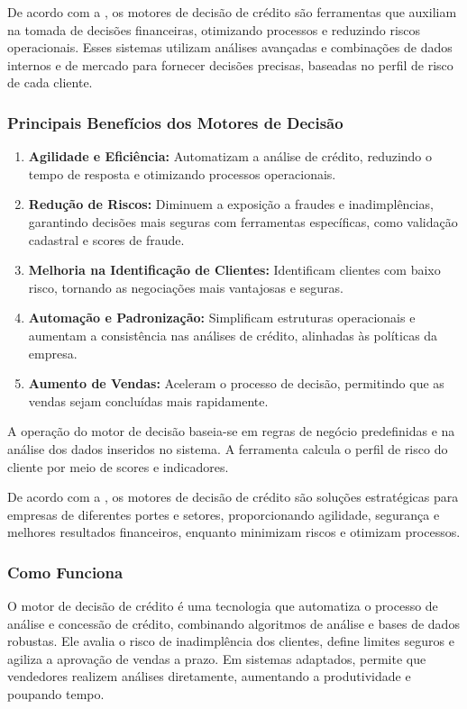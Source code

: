 \documentclass[12pt,a4paper]{article}
\begin{document}
De acordo com a \cite{serasa2024}, os motores de decisão de crédito são ferramentas que auxiliam na tomada de decisões financeiras, otimizando processos e reduzindo riscos operacionais. Esses sistemas utilizam análises avançadas e combinações de dados internos e de mercado para fornecer decisões precisas, baseadas no perfil de risco de cada cliente.

\subsubsection{Principais Benefícios dos Motores de Decisão}

\begin{enumerate}
    \item \textbf{Agilidade e Eficiência:} Automatizam a análise de crédito, reduzindo o tempo de resposta e otimizando processos operacionais.
    \item \textbf{Redução de Riscos:} Diminuem a exposição a fraudes e inadimplências, garantindo decisões mais seguras com ferramentas específicas, como validação cadastral e scores de fraude.
    \item \textbf{Melhoria na Identificação de Clientes:} Identificam clientes com baixo risco, tornando as negociações mais vantajosas e seguras.
    \item \textbf{Automação e Padronização:} Simplificam estruturas operacionais e aumentam a consistência nas análises de crédito, alinhadas às políticas da empresa.
    \item \textbf{Aumento de Vendas:} Aceleram o processo de decisão, permitindo que as vendas sejam concluídas mais rapidamente.
\end{enumerate}

A operação do motor de decisão baseia-se em regras de negócio predefinidas e na análise dos dados inseridos no sistema. A ferramenta calcula o perfil de risco do cliente por meio de scores e indicadores. 

De acordo com a \cite{deps_sd}, os motores de decisão de crédito são soluções estratégicas para empresas de diferentes portes e setores, proporcionando agilidade, segurança e melhores resultados financeiros, enquanto minimizam riscos e otimizam processos.

\subsubsection{Como Funciona}

O motor de decisão de crédito é uma tecnologia que automatiza o processo de análise e concessão de crédito, combinando algoritmos de análise e bases de dados robustas. Ele avalia o risco de inadimplência dos clientes, define limites seguros e agiliza a aprovação de vendas a prazo. Em sistemas adaptados, permite que vendedores realizem análises diretamente, aumentando a produtividade e poupando tempo.
\end{document}
